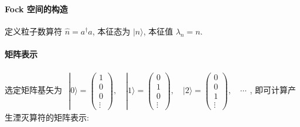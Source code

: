 \documentclass[../../main.tex]{subfiles}
\begin{document}
\paragraph{Fock 空间的构造}
定义粒子数算符 $\hat{n} = a^{\dagger}a$, 本征态为 $|n\rangle$, 本征值 $\lambda_{n} = n$. 
\paragraph{矩阵表示}
选定矩阵基矢为 $\begin{aligned}
    |0\rangle = \begin{pmatrix}
        1\\0\\0\\\vdots
    \end{pmatrix},\quad |1\rangle = \begin{pmatrix}
        0\\1\\0\\\vdots
    \end{pmatrix},\quad |2\rangle = \begin{pmatrix}
        0\\0\\1\\\vdots
    \end{pmatrix},\quad\cdots
\end{aligned}$, 即可计算产生湮灭算符的矩阵表示:
\end{document}
